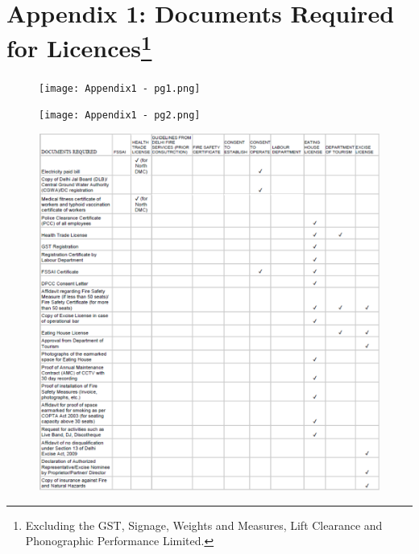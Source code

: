 \documentclass[a4paper, 12pt]{article}
\begin{document}
	
	
	
	      
        
		\newpage      
		\section*{Appendix 1: Documents Required for Licences\footnote{Excluding the GST, Signage, Weights and Measures, Lift Clearance and Phonographic Performance Limited.}}
		\label {Appendix1}
         
		\begin{figure}[H]
                    	\centering
                    	\texttt{[image: Appendix1 - pg1.png]} 
		\end{figure}

		\begin{figure}[H]
                    	\centering
                    	\texttt{[image: Appendix1 - pg2.png]} 
		\end{figure}
		
		\begin{figure}[H]
                    	\centering
                    	\includegraphics{Appendix1 - pg3.png} 
		\end{figure}
        
\end{document}
